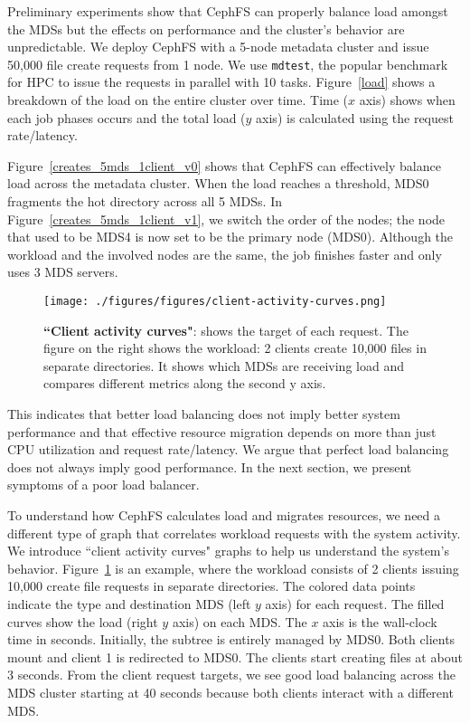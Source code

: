 Preliminary experiments show that CephFS can properly balance load amongst the MDSs but the effects on performance and the cluster's behavior are unpredictable. We deploy CephFS with a 5-node metadata cluster and issue 50,000 file create requests from 1 node. We use \texttt{mdtest}, the popular benchmark for HPC to issue the requests in parallel with 10 tasks. Figure~\ref{load} shows a breakdown of the load on the entire cluster over time. Time (\(x\) axis) shows when each job phases occurs and the total load (\(y\) axis) is calculated using the request rate/latency. 
  
Figure~\ref{creates_5mds_1client_v0} shows that CephFS can effectively balance load across the metadata cluster.  When the load reaches a threshold, MDS0 fragments the hot directory across all 5 MDSs. In Figure~\ref{creates_5mds_1client_v1}, we switch the order of the nodes; the node that used to be MDS4 is now set to be the primary node (MDS0). Although the workload and the involved nodes are the same, the job finishes faster and only uses 3 MDS servers.
\begin{figure}[tbh]
	\centering	
	\texttt{[image: ./figures/figures/client-activity-curves.png]}
	\caption{\textbf{``Client activity curves"}: shows the target of each request. The figure on the right shows the workload: 2 clients create 10,000 files in separate directories. It shows which MDSs are receiving load and compares different metrics along the second y axis.\label{client-activity-curves}}
\end{figure}

This indicates that better load balancing does not imply better system performance and that effective resource migration depends on more than just CPU utilization and request rate/latency. We argue that perfect load balancing does not always imply good performance. In the next section, we present symptoms of a poor load balancer. 

To understand how CephFS calculates load and migrates resources, we need a different type of graph that correlates workload requests with the system activity. We introduce ``client activity curves" graphs to help us understand the system's behavior. Figure~\ref{client-activity-curves} is an example, where the workload consists of 2 clients issuing 10,000 create file requests in separate directories. The colored data points indicate the type and destination MDS (left \(y\) axis) for each request. The filled curves show the load (right \(y\) axis) on each MDS. The \(x\) axis is the wall-clock time in seconds. Initially, the subtree is entirely managed by MDS0. Both clients mount and client 1 is redirected to MDS0. The clients start creating files at about 3 seconds. From the client request targets, we see good load balancing across the MDS cluster starting at 40 seconds because both clients interact with a different MDS. 

